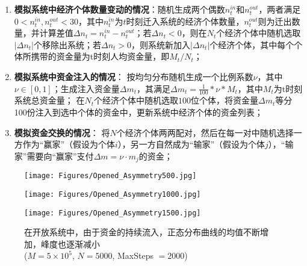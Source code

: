 \documentclass[tsinghuacite]{HustGraduPaper}
\begin{document}
		\begin{enumerate}[label=(\roman*)]
		
			\item {\bfseries 模拟系统中经济个体数量变动的情况}：随机生成两个偶数$n_{t}^{in}$和$n_{t}^{out}$，两者满足$0<n_{t}^{in}, n_{t}^{out}<30$，其中$n_{t}^{in}$为$t$时刻迁入系统的经济个体数量，$n_{t}^{out}$则为迁出数量，并计算差值$\Delta n_{t} = n_{t}^{in} - n_{t}^{out}$；若$\Delta n_{t} < 0$，则在$N_t$个经济个体中随机选取$ \lvert \Delta n_{t} \rvert $个移除出系统；若$\Delta n_{t} > 0$，则系统新加入$\lvert \Delta n_{t} \rvert $个经济个体，其中每个个体所携带的资金量为t时刻人均资金量，即$M_t / N_t$；

			
			\item {\bfseries 模拟系统中资金注入的情况}： 按均匀分布随机生成一个比例系数$\nu$，其中$\nu \in [0,1]$；生成注入资金量$\Delta m_t$，其满足$\Delta m_t =  \frac{1}{100} * \nu * M_t $，其中$M_t$为t时刻系统总资金量； 在$N_t$个经济个体中随机选取$100$位个体，将资金量$\Delta m_t$等分100份注入到选中个体的资金中，更新系统中经济个体的资金列表；
				
			
			\item {\bfseries 模拟资金交换的情况}： 将$N$个经济个体两两配对，然后在每一对中随机选择一方作为“赢家”（假设为个体$i$），另一方自然成为“输家”（假设为个体$j$），“输家”需要向“赢家”支付$\Delta m = \nu \cdot m_j$的资金；

		\end{enumerate}
		
		\begin{figure}[htbp]
			\centering                                                 

			\begin{minipage}[t]{0.49\textwidth}                                                      
			\texttt{[image: Figures/Opened\_Asymmetry500.jpg]}               
			\end{minipage}
			\begin{minipage}[t]{0.49\textwidth}                 
			\texttt{[image: Figures/Opened\_Asymmetry1000.jpg]}               
			\end{minipage}
			
			\begin{minipage}[t]{0.49\textwidth}                 
			\texttt{[image: Figures/Opened\_Asymmetry1500.jpg]}               
			\end{minipage}

			\caption{在开放系统中，由于资金的持续流入，正态分布曲线的均值不断增加，峰度也逐渐减小 \\ ($M = 5 \times 10^5$, $N = 5000$, MaxSteps $= 2000$)} 
			\label{fig:Opened_Asymmetry}                                                        
		\end{figure}
\end{document}
